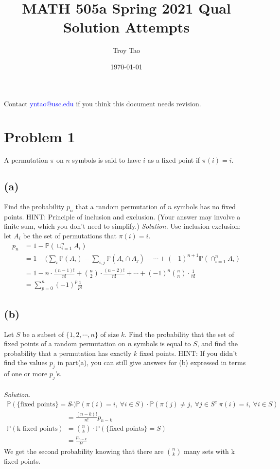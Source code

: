 \documentclass{article}
\title{MATH 505a Spring 2021 Qual Solution Attempts}
\author{Troy Tao}
\date\today
\newcommand{\prob}{\mathbb{P}}
\begin{document}
\maketitle 
Contact \textcolor{blue}{yntao@usc.edu} if you think this document needs revision.

\section*{Problem 1}
A permutation $\pi$ on $n$ symbols is said to have $i$ as a fixed point if $\pi(i)=i$.
\subsection*{(a)}
Find the probability $p_n$ that a random permutation of $n$ symbols has no fixed points. HINT: Principle of inclusion and exclusion. (Your answer may involve a finite sum, which you don't need to simplify.)
\color{blue}
\newline
\newline
\textit{Solution.} Use inclusion-exclusion: let $A_i$ be the set of permutations that $\pi(i)=i$.
\begin{equation*}
    \begin{split}
        p_n &= 1- \prob(\cup_{i=1}^n A_i)\\
            &= 1 -(\sum_i\prob(A_i)-\sum_{i,j} \prob(A_i\cap A_j) +\cdots +(-1)^{n+1} \prob(\cap_{i=1}^n A_i)\\
            &= 1-n\cdot\frac{(n-1)!}{n!} +{n \choose 2}\cdot \frac{(n-2)!}{n!} +\cdots+(-1)^{n}{n \choose n} \cdot \frac{1}{n!}\\
            &= \sum_{p=0}^n(-1)^p\frac{1}{p!}
    \end{split}
\end{equation*}
\color{black}
\subsection*{(b)}
Let $S$ be a subset of $\{1,2,\cdots,n\}$ of size $k$. Find the probability that the set of fixed points of a random permutation on $n$ symbols is equal to $S$, and find the probability that a permutation has exactly $k$ fixed points. HINT: If you didn't find the values $p_j$ in part(a), you can still give answers for (b) expressed in terms of one or more $p_j$'s.
\color{blue}
\\\\
\textit{Solution.} 
\begin{equation*}
    \begin{split}
        \prob(\{\text{fixed points}\}=S) &= \prob(\pi(i)=i,\  \forall i \in S)\cdot\prob(\pi(j) \neq j,\  \forall j \in S^c|\pi(i)=i,\  \forall i \in S)\\
            &= \frac{(n-k)!}{n!}p_{n-k}\\
        \prob(\text{k fixed points}) &= {n \choose k} \cdot \prob(\{\text{fixed points}\}=S)\\
            &=\frac{p_{n-k}}{k!}
    \end{split}
\end{equation*}
We get the second probability knowing that there are ${n \choose k}$ many sets with k fixed points.
\color{black}
\end{document}
